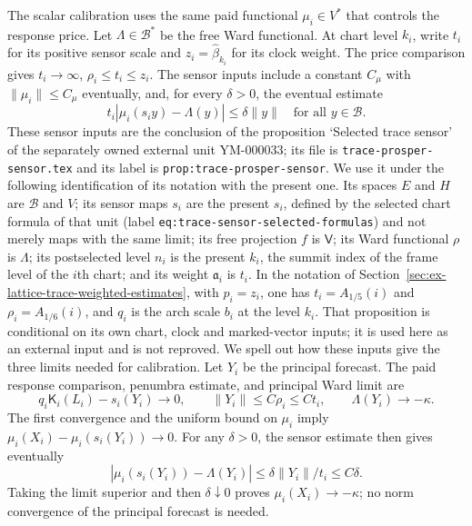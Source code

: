 The scalar calibration uses the same paid functional $\mu_i\in V^*$ that controls
the response price. Let $\Lambda\in\mathcal B^*$ be the free Ward functional.
At chart level $k_i$, write $t_i$ for its positive sensor
scale and $z_i=\widehat\beta_{k_i}$ for its clock weight. The price comparison
gives $t_i\to\infty$, $\rho_i\le t_i\le z_i$. The sensor inputs
include a constant $C_\mu$ with $\|\mu_i\|\le C_\mu$ eventually, and, for
every $\delta>0$, the eventual estimate
\[
 t_i\left|\mu_i(s_i y)-\Lambda(y)\right|
       \le\delta\|y\|\quad\text{for all }y\in\mathcal B.
\]
These sensor inputs are the conclusion of
the proposition `Selected trace sensor' of the separately owned external
unit YM-000033; its file is \texttt{trace-prosper-sensor.tex} and its
label is \texttt{prop:trace-prosper-sensor}. We use it under the
following identification of its notation with the present one. Its spaces $E$ and $H$ are $\mathcal B$ and $V$; its sensor
maps $s_i$ are the present $s_i$, defined by the selected chart formula
of that unit (label \texttt{eq:trace-sensor-selected-formulas}) and not
merely maps with the
same limit; its free projection $f$ is $\mathsf V$; its Ward functional
$\rho$ is $\Lambda$; its postselected level $n_i$ is the present $k_i$,
the summit index of the frame level of the $i$th chart; and its weight
$\mathfrak a_i$ is $t_i$. In the notation of
Section~\ref{sec:ex-lattice-trace-weighted-estimates}, with $p_i=z_i$,
one has $t_i=A_{1/5}(i)$ and $\rho_i=A_{1/6}(i)$, and $q_i$ is the arch
scale $b_i$ at the level $k_i$. That proposition is conditional on its own
chart, clock and marked-vector inputs; it is used here as an external
input and is not reproved. We spell out how these inputs
give the three limits needed for calibration. Let $Y_i$ be the principal
forecast. The paid response comparison, penumbra estimate, and principal
Ward limit are
\begin{equation}
 q_i\mathsf K_i(L_i)-s_i(Y_i)\longrightarrow0,\qquad
 \|Y_i\|\le C\rho_i\le Ct_i,\qquad
 \Lambda(Y_i)\longrightarrow-\kappa.
 \label{eq:ex-lattice-scribe-principal-response-input}
\end{equation}
The first convergence and the uniform bound on $\mu_i$ imply
$\mu_i(X_i)-\mu_i(s_i(Y_i))\to0$. For any $\delta>0$, the sensor estimate
then gives eventually
\[
 |\mu_i(s_i(Y_i))-\Lambda(Y_i)|
       \le \delta\|Y_i\|/t_i\le C\delta.
\]
Taking the limit superior and then $\delta\downarrow0$ proves
$\mu_i(X_i)\to-\kappa$; no norm convergence of the principal forecast is
needed.

